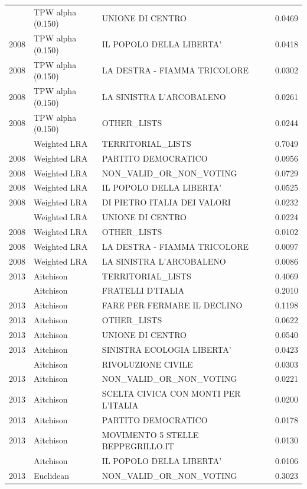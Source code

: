 \begin{longtable}[t]{rllr}
\addlinespace
2008 & TPW alpha (0.150) & UNIONE DI CENTRO & 0.0469\\
2008 & TPW alpha (0.150) & IL POPOLO DELLA LIBERTA' & 0.0418\\
2008 & TPW alpha (0.150) & LA DESTRA - FIAMMA TRICOLORE & 0.0302\\
2008 & TPW alpha (0.150) & LA SINISTRA L'ARCOBALENO & 0.0261\\
2008 & TPW alpha (0.150) & OTHER\_LISTS & 0.0244\\
\addlinespace
2008 & Weighted LRA & TERRITORIAL\_LISTS & 0.7049\\
2008 & Weighted LRA & PARTITO DEMOCRATICO & 0.0956\\
2008 & Weighted LRA & NON\_VALID\_OR\_NON\_VOTING & 0.0729\\
2008 & Weighted LRA & IL POPOLO DELLA LIBERTA' & 0.0525\\
2008 & Weighted LRA & DI PIETRO ITALIA DEI VALORI & 0.0232\\
\addlinespace
2008 & Weighted LRA & UNIONE DI CENTRO & 0.0224\\
2008 & Weighted LRA & OTHER\_LISTS & 0.0102\\
2008 & Weighted LRA & LA DESTRA - FIAMMA TRICOLORE & 0.0097\\
2008 & Weighted LRA & LA SINISTRA L'ARCOBALENO & 0.0086\\
2013 & Aitchison & TERRITORIAL\_LISTS & 0.4069\\
\addlinespace
2013 & Aitchison & FRATELLI D'ITALIA & 0.2010\\
2013 & Aitchison & FARE PER FERMARE IL DECLINO & 0.1198\\
2013 & Aitchison & OTHER\_LISTS & 0.0622\\
2013 & Aitchison & UNIONE DI CENTRO & 0.0540\\
2013 & Aitchison & SINISTRA ECOLOGIA LIBERTA' & 0.0423\\
\addlinespace
2013 & Aitchison & RIVOLUZIONE CIVILE & 0.0303\\
2013 & Aitchison & NON\_VALID\_OR\_NON\_VOTING & 0.0221\\
2013 & Aitchison & SCELTA CIVICA CON MONTI PER L'ITALIA & 0.0200\\
2013 & Aitchison & PARTITO DEMOCRATICO & 0.0178\\
2013 & Aitchison & MOVIMENTO 5 STELLE BEPPEGRILLO.IT & 0.0130\\
\addlinespace
2013 & Aitchison & IL POPOLO DELLA LIBERTA' & 0.0106\\
2013 & Euclidean & NON\_VALID\_OR\_NON\_VOTING & 0.3023\\

\end{longtable}
